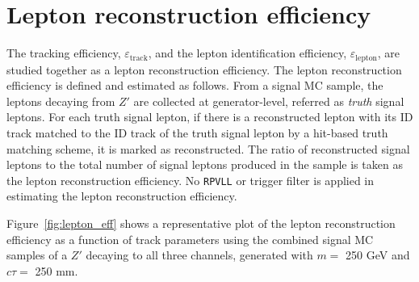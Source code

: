 \section{Lepton reconstruction efficiency}
\label{sec:tracking_efficiency}
The tracking efficiency, $\varepsilon_{\mathrm{track}}$, and the lepton identification efficiency, $\varepsilon_{\mathrm{lepton}}$, are studied together as a lepton reconstruction efficiency. The lepton reconstruction efficiency is defined and estimated as follows. From a signal MC sample, the leptons decaying from $Z'$ are collected at generator-level, referred as \textit{truth} signal leptons. For each truth signal lepton, if there is a reconstructed lepton with its ID track matched to the ID track of the truth signal lepton by a hit-based truth matching scheme, it is marked as reconstructed. The ratio of reconstructed signal leptons to the total number of signal leptons produced in the sample is taken as the lepton reconstruction efficiency. No \texttt{RPVLL} or trigger filter is applied in estimating the lepton reconstruction efficiency.

Figure~\ref{fig:lepton_eff} shows a representative plot of the lepton reconstruction efficiency as a function of track parameters using the combined signal MC samples of a $Z'$ decaying to all three channels, generated with $m = $ 250 GeV and $c\tau=$ 250 mm.

